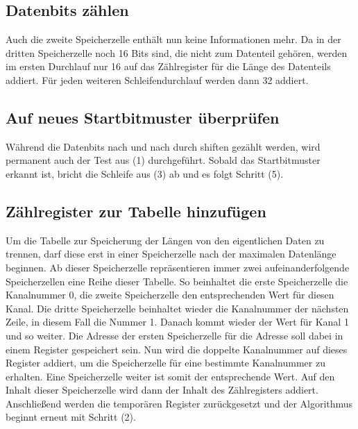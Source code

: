 \documentclass[12pt,titlepage,german,a4]{article}
\begin{document}
    \subsection{Datenbits z{\"a}hlen}
    Auch die zweite Speicherzelle enth{\"a}lt nun keine Informationen mehr. Da in der dritten Speicherzelle noch 16 Bits sind, die nicht zum Datenteil geh{\"o}ren, werden im ersten Durchlauf nur 16 auf das Z{\"a}hlregister f{\"u}r die L{\"a}nge des Datenteils addiert. F{\"u}r jeden weiteren Schleifendurchlauf werden dann 32 addiert.

    \subsection{Auf neues Startbitmuster {\"u}berpr{\"u}fen}
    W{\"a}hrend die Datenbits nach und nach durch shiften gez{\"a}hlt werden, wird permanent auch der Test aus (1) durchgef{\"u}hrt. Sobald das Startbitmuster erkannt ist, bricht die Schleife aus (3) ab und es folgt Schritt (5).

    \subsection{Z{\"a}hlregister zur Tabelle hinzuf{\"u}gen}
    Um die Tabelle zur Speicherung der L{\"a}ngen von den eigentlichen Daten zu trennen, darf diese erst in einer Speicherzelle nach der maximalen Datenl{\"a}nge beginnen. Ab dieser Speicherzelle repr{\"a}sentieren immer zwei aufeinanderfolgende Speicherzellen eine Reihe dieser Tabelle. So beinhaltet die erste Speicherzelle die Kanalnummer 0, die zweite Speicherzelle den entsprechenden Wert f{\"u}r diesen Kanal. Die dritte Speicherzelle beinhaltet wieder die Kanalnummer der n{\"a}chsten Zeile, in diesem Fall die Nummer 1. Danach kommt wieder der Wert f{\"u}r Kanal 1 und so weiter. Die Adresse der ersten Speicherzelle f{\"u}r die Adresse soll dabei in einem Register gespeichert sein. Nun wird die doppelte Kanalnummer auf dieses Register addiert, um die Speicherzelle f{\"u}r eine bestimmte Kanalnummer zu erhalten. Eine Speicherzelle weiter ist somit der entsprechende Wert. Auf den Inhalt dieser Speicherzelle wird dann der Inhalt des Z{\"a}hlregisters addiert. Anschlie{\ss}end werden die tempor{\"a}ren Register zur{\"u}ckgesetzt und der Algorithmus beginnt erneut mit Schritt (2).

    \newpage
\end{document}
